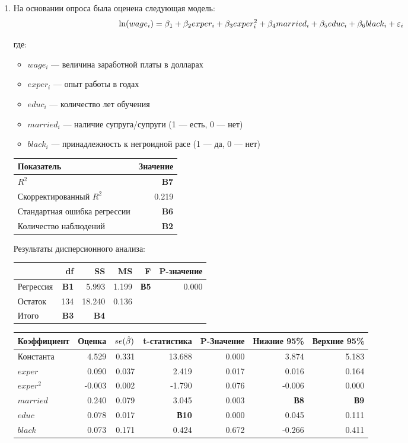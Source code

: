 \documentclass[12pt, a4paper]{article}
\begin{document}
\begin{enumerate}

\item На основании опроса была оценена следующая модель:
\[
\ln(wage_i)=\beta_1 + \beta_2 exper_i + \beta_3 exper_i^2 + \beta_4 married_i + \beta_5 educ_i + \beta_6 black_i + \varepsilon_i
\]

где:
\begin{itemize}
\item $wage_i$ — величина заработной платы в долларах
\item $exper_i$ — опыт работы в годах
\item $educ_i$ — количество лет обучения
\item $married_i$ — наличие супруга/супруги (1 — есть, 0 — нет)
\item $black_i$ — принадлежность к негроидной расе (1 — да, 0 — нет)
\end{itemize}

\begin{tabular}{lr} \toprule
Показатель & Значение \\
\midrule
$R^2$                        & \textbf{B7} \\
Скорректированный $R^2$      & 0.219 \\
Стандартная ошибка регрессии & \textbf{B6} \\
Количество наблюдений        & \textbf{B2} \\
\bottomrule
\end{tabular}

Результаты дисперсионного анализа:

\begin{tabular}{lrrrrr} \toprule
 & df & SS & MS & F & P-значение \\
\midrule
Регрессия   & \textbf{B1}  & 5.993  & 1.199 & \textbf{В5} & 0.000 \\
Остаток     & 134 & 18.240 & 0.136 &    &       \\
Итого       & \textbf{B3}  & \textbf{B4}     &       &    &       \\
\bottomrule
\end{tabular}


\begin{tabular}{lrrrrrr} \toprule
Коэффициент & Оценка & $se(\hat{\beta})$ & t-статистика & P-Значение & Нижние 95\% & Верхние 95\% \\
\midrule
Константа & 4.529 & 0.331 & 13.688 & 0.000 & 3.874 & 5.183 \\
$exper$ & 0.090 & 0.037 & 2.419 & 0.017 & 0.016 & 0.164 \\
$exper^2$ & -0.003 & 0.002 & -1.790 & 0.076 & -0.006 & 0.000 \\
$married$ & 0.240 & 0.079 & 3.045 & 0.003 & \textbf{В8} & \textbf{В9} \\
$educ$ & 0.078 & 0.017 & \textbf{В10} & 0.000 & 0.045 & 0.111 \\
$black$ & 0.073 & 0.171 & 0.424 & 0.672 & -0.266 & 0.411 \\
\bottomrule
\end{tabular}


\end{enumerate}
\end{document}
